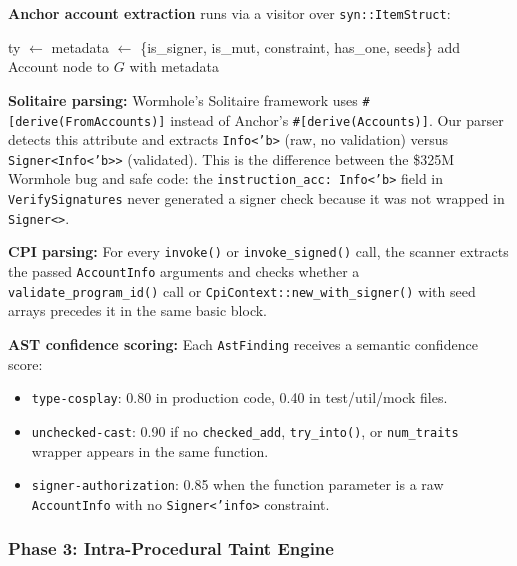 \documentclass{article}
\begin{document}
\textbf{Anchor account extraction} runs via a visitor over \texttt{syn::ItemStruct}:
\vspace{-2pt}
\begin{algorithm}[H]
\caption{Extract Anchor Accounts}\label{alg:anchor}
\begin{algorithmic}[1]
      \State ty $\gets$ 
      \State metadata $\gets$ \{is\_signer, is\_mut, constraint, has\_one, seeds\}
      \State add Account node to $G$ with metadata
    \EndFor
  \EndIf
\EndFunction
\end{algorithmic}
\end{algorithm}
\vspace{-2pt}
\textbf{Solitaire parsing:} Wormhole's Solitaire framework uses \texttt{\#[derive(FromAccounts)]} instead of Anchor's \texttt{\#[derive(Accounts)]}. Our parser detects this attribute and extracts \texttt{Info<'b>} (raw, no validation) versus \texttt{Signer<Info<'b>>} (validated). This is the difference between the \$325M Wormhole bug and safe code: the \texttt{instruction\_acc: Info<'b>} field in \texttt{VerifySignatures} never generated a signer check because it was not wrapped in \texttt{Signer<>}.

\textbf{CPI parsing:} For every \texttt{invoke()} or \texttt{invoke\_signed()} call, the scanner extracts the passed \texttt{AccountInfo} arguments and checks whether a \texttt{validate\_program\_id()} call or \texttt{CpiContext::new\_with\_signer()} with seed arrays precedes it in the same basic block.

\textbf{AST confidence scoring:} Each \texttt{AstFinding} receives a semantic confidence score:
\begin{itemize}
  \item \texttt{type-cosplay}: 0.80 in production code, 0.40 in test/util/mock files.
  \item \texttt{unchecked-cast}: 0.90 if no \texttt{checked\_add}, \texttt{try\_into()}, or \texttt{num\_traits} wrapper appears in the same function.
  \item \texttt{signer-authorization}: 0.85 when the function parameter is a raw \texttt{AccountInfo} with no \texttt{Signer<'info>} constraint.
\end{itemize}

\subsubsection{Phase 3: Intra-Procedural Taint Engine}
\end{document}
